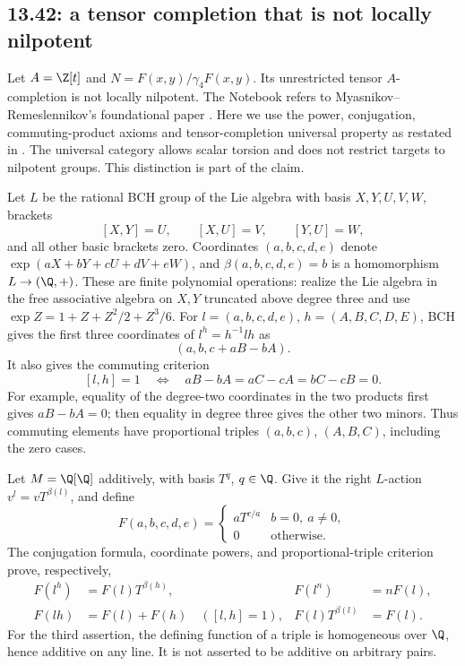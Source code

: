 \subsection{13.42: a tensor completion that is not locally nilpotent}
\label{cand:13.42}
Let \(A=\Z[t]\) and \(N=F(x,y)/\gamma_4F(x,y)\).
Its unrestricted tensor \(A\)-completion is not locally nilpotent.
The Notebook refers to Myasnikov--Remeslennikov's foundational paper
\cite{exponential-groups-1}. Here we use the power, conjugation,
commuting-product axioms and tensor-completion universal property
as restated in \cite[Definitions~1--2]{exponential-groups}.
The universal category allows scalar torsion and does not restrict
targets to nilpotent groups. This distinction is part of the claim.

Let \(L\) be the rational BCH group of the Lie algebra with basis
\(X,Y,U,V,W\), brackets
\[
 [X,Y]=U,\qquad [X,U]=V,\qquad [Y,U]=W,
\]
and all other basic brackets zero.
Coordinates \((a,b,c,d,e)\) denote
\(\exp(aX+bY+cU+dV+eW)\), and \(\beta(a,b,c,d,e)=b\) is a
homomorphism \(L\to(\Q,+)\).
These are finite polynomial operations: realize the Lie algebra in
the free associative algebra on \(X,Y\) truncated above degree three
and use \(\exp Z=1+Z+Z^2/2+Z^3/6\).
For \(l=(a,b,c,d,e)\), \(h=(A,B,C,D,E)\), BCH gives the first
three coordinates of \(l^h=h^{-1}lh\) as
\[
 (a,b,c+aB-bA).
\]
It also gives the commuting criterion
\[
 [l,h]=1\quad\Longleftrightarrow\quad
 aB-bA=aC-cA=bC-cB=0.
\]
For example, equality of the degree-two coordinates in the two
products first gives \(aB-bA=0\); then equality in degree three
gives the other two minors. Thus commuting elements have proportional
triples \((a,b,c)\), \((A,B,C)\), including the zero cases.

Let \(M=\Q[\Q]\) additively, with basis \(T^q\), \(q\in\Q\).
Give it the right \(L\)-action \(v^l=vT^{\beta(l)}\), and define
\[
 F(a,b,c,d,e)=
 \begin{cases}aT^{c/a}&b=0,\ a\ne0,\\0&\text{otherwise}.\end{cases}
\]
The conjugation formula, coordinate powers, and proportional-triple
criterion prove, respectively,
\[
 \begin{aligned}
 F(l^h)&=F(l)T^{\beta(h)},&
 F(l^n)&=nF(l),\\
 F(lh)&=F(l)+F(h)\quad([l,h]=1),&
 F(l)T^{\beta(l)}&=F(l).
 \end{aligned}
\]
For the third assertion, the defining function of a triple is
homogeneous over \(\Q\), hence additive on any line.
It is not asserted to be additive on arbitrary pairs.


